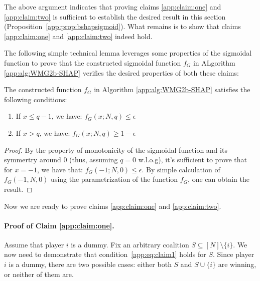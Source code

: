 

The above argument indicates that proving claims \ref{app:claim:one} and \ref{app:claim:two} is sufficient to establish the desired result in this section (Proposition~\ref{app:prop:bshapsigmoid}). What remains is to show that claims \ref{app:claim:one} and \ref{app:claim:two} indeed hold. 

The following simple technical lemma leverages some properties of the sigmoidal function to prove that the constructed sigmoidal function $f_{G}$ in ALgorithm \ref{app:alg:WMG2b-SHAP} verifies the desired properties of both these claims: 

\begin{lemma} \label{app:lemma:technicallemma}
 The constructed function $f_{G}$ in Algorithm \ref{app:alg:WMG2b-SHAP}
  satisfies the following conditions:
  \begin{enumerate}
      \item If $x \leq q-1$, we have: $f_G(x; N,q) \leq \epsilon$
      \item If $x > q$, we have: $f_G(x;N,q) \geq 1 - \epsilon$
  \end{enumerate}
\end{lemma}
\begin{proof}
   By the property of monotonicity of the sigmoidal function and its symmertry around $0$ (thus, assuming $q = 0$ w.l.o.g), it's sufficient to prove that for $x = -1$, we have that: 
   $f_{G}(-1;N,0) \leq \epsilon$. By simple calculation of $f_{G}(-1,N,0)$ using the parametrization of the function $f_{G}$, one can obtain the result.   
\end{proof}

Now we are ready to prove claims \ref{app:claim:one} and \ref{app:claim:two}.

\paragraph{Proof of Claim \ref{app:claim:one}.}
Assume that player $i$ is a dummy. Fix an arbitrary coalition $S \subseteq [N] \setminus \{i\}$. We now need to demonstrate that condition~\eqref{app:eq:claim1} holds for $S$. Since player $i$ is a dummy, there are two possible cases: either both $S$ and $S \cup \{i\}$ are winning, or neither of them are.

